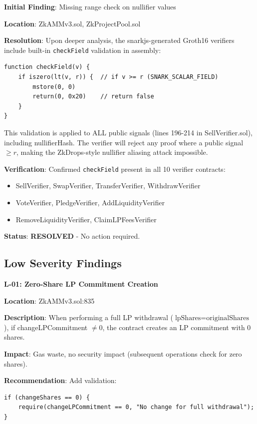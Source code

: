 \documentclass[11pt,a4paper]{article}
\begin{document}
\begin{tcolorbox}[colback=green!10, colframe=green!50!black, title=\textbf{M-01: RESOLVED - SNARK Scalar Field Range Check}]
\textbf{Initial Finding}: Missing range check on nullifier values

\textbf{Location}: ZkAMMv3.sol, ZkProjectPool.sol

\textbf{Resolution}: Upon deeper analysis, the snarkjs-generated Groth16 verifiers include built-in \texttt{checkField} validation in assembly:

\begin{lstlisting}[style=solidity, caption={Verifier Range Check (SellVerifier.sol:85-90)}]
function checkField(v) {
    if iszero(lt(v, r)) {  // if v >= r (SNARK_SCALAR_FIELD)
        mstore(0, 0)
        return(0, 0x20)    // return false
    }
}
\end{lstlisting}

This validation is applied to ALL public signals (lines 196-214 in SellVerifier.sol), including nullifierHash. The verifier will reject any proof where a public signal $\geq r$, making the ZkDrops-style nullifier aliasing attack impossible.

\textbf{Verification}: Confirmed \texttt{checkField} present in all 10 verifier contracts:
\begin{itemize}
    \item SellVerifier, SwapVerifier, TransferVerifier, WithdrawVerifier
    \item VoteVerifier, PledgeVerifier, AddLiquidityVerifier
    \item RemoveLiquidityVerifier, ClaimLPFeesVerifier
\end{itemize}

\textbf{Status}: \textcolor{green!50!black}{\textbf{RESOLVED}} - No action required.
\end{tcolorbox}

\subsection{Low Severity Findings}

\begin{lowseverity}
\textbf{L-01: Zero-Share LP Commitment Creation}

\textbf{Location}: ZkAMMv3.sol:835

\textbf{Description}: When performing a full LP withdrawal ($\text{lpShares} = \text{originalShares}$), if changeLPCommitment $\neq 0$, the contract creates an LP commitment with 0 shares.

\textbf{Impact}: Gas waste, no security impact (subsequent operations check for zero shares).

\textbf{Recommendation}: Add validation:
\begin{lstlisting}[style=solidity]
if (changeShares == 0) {
    require(changeLPCommitment == 0, "No change for full withdrawal");
}
\end{lstlisting}
\end{lowseverity}
\end{document}
